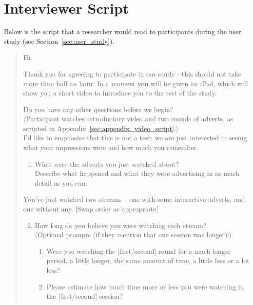 \section{Interviewer Script}
\label{sec:appendix_interview_script}

Below is the script that a researcher would read to participants during the user study (see Section~\ref{sec:user_study}).

\begin{quotation}
	\noindent Hi.

	Thank you for agreeing to participate in our study - this should not take more than half an hour. In a moment you will be given an iPad, which will show you a short video to introduce you to the rest of the study.

	Do you have any other questions before we begin?\\

	\noindent $\langle$Participant watches introductory video and two rounds of adverts, as scripted in Appendix~\ref{sec:appendix_video_script}.$\rangle$\\

	\noindent I'd like to emphasise that this is not a test: we are just interested in seeing what your impressions were and how much you remember.\\

	\begin{enumerate}
		\item What were the adverts you just watched about? \\
			Describe what happened and what they were advertising in as much detail as you can.\\
	\end{enumerate}

	\noindent You've just watched two streams -- one with some interactive adverts, and one without any. [Swap order as appropriate]\\

	\begin{enumerate}
	  	\setcounter{enumi}{1}
		\item How long do you believe you were watching each stream?\\
			$\langle$Optional prompts (if they mention that one session was longer):$\rangle$
		\begin{enumerate}[label=\alph*]
			\item Were you watching the [first/second] round for a much longer period, a little longer, the same amount of time, a little less or a lot less?
			\item Please estimate how much time more or less you were watching in the [first/second] session?
		\end{enumerate}


\end{enumerate}
\end{quotation}
